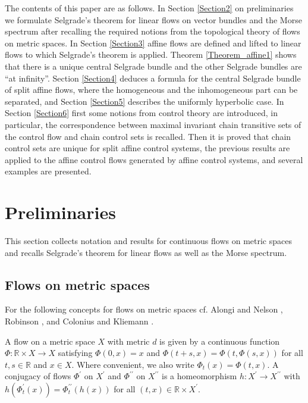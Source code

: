 	The contents of this paper are as follows. In Section \ref{Section2} on
	preliminaries we formulate Selgrade's theorem for linear flows on vector
	bundles and the Morse spectrum after recalling the required notions from the
	topological theory of flows on metric spaces. In Section \ref{Section3} affine
	flows are defined and lifted to linear flows to which Selgrade's theorem is
	applied. Theorem \ref{Theorem_affine1} shows that there is a unique central
	Selgrade bundle and the other Selgrade bundles are \textquotedblleft at
	infinity\textquotedblright. Section \ref{Section4} deduces a formula for the
	central Selgrade bundle of split affine flows, where the homogeneous and the
	inhomogeneous part can be separated, and Section \ref{Section5} describes the
	uniformly hyperbolic case. In Section \ref{Section6} first some notions from
	control theory are introduced, in particular, the correspondence between
	maximal invariant chain transitive sets of the control flow and chain control
	sets is recalled. Then it is proved that chain control sets are unique for
	split affine control systems, the previous results are applied to the affine
	control flows generated by affine control systems, and several examples are presented.
	
	\section{Preliminaries\label{Section2}}
	
	This section collects notation and results for continuous flows on metric
	spaces and recalls Selgrade's theorem for linear flows as well as the Morse spectrum.
	
	\subsection{Flows on metric spaces\label{Subsection2.1}}
	
	For the following concepts for flows on metric spaces cf. Alongi and Nelson
	\cite{AlonN07}, Robinson \cite{Robin98}, and Colonius and Kliemann
	\cite{ColK00, ColK14}.
	
	A flow on a metric space $X$ with metric $d$ is given by a continuous function
	$\Phi:\mathbb{R}\times X\rightarrow X$ satisfying $\Phi(0,x)=x$ and
	$\Phi(t+s,x)=\Phi(t,\Phi(s,x))$ for all $t,s\in\mathbb{R}$ and $x\in X$. Where
	convenient, we also write $\Phi_{t}(x)=\Phi(t,x)$. A conjugacy of flows
	$\Phi^{\prime}$ on $X^{\prime}$ and $\Phi^{\prime\prime}$ on $X^{\prime\prime
	}$ is a homeomorphism $h:X^{\prime}\rightarrow X^{\prime\prime}$ with
	$h(\Phi_{t}^{\prime}(x))=\Phi_{t}^{\prime\prime}(h(x))$ for all $(t,x)\in
	\mathbb{R}\times X^{\prime}$.
	
